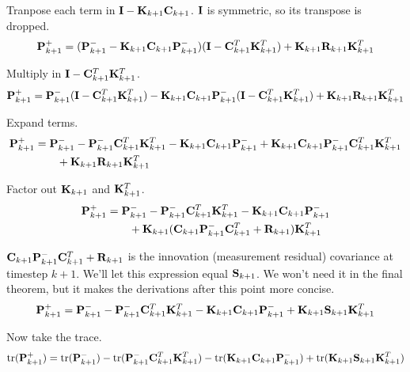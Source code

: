Tranpose each term in $\mathbf{I} - \mathbf{K}_{k+1}\mathbf{C}_{k+1}$. $\mathbf{I}$ is
symmetric, so its transpose is dropped.
\begin{equation*}
  \mathbf{P}_{k+1}^+ =
    (\mathbf{P}_{k+1}^- - \mathbf{K}_{k+1}\mathbf{C}_{k+1}\mathbf{P}_{k+1}^-)
    (\mathbf{I} - \mathbf{C}_{k+1}^T\mathbf{K}_{k+1}^T) +
    \mathbf{K}_{k+1}\mathbf{R}_{k+1} \mathbf{K}_{k+1}^T
\end{equation*}

Multiply in $\mathbf{I} - \mathbf{C}_{k+1}^T\mathbf{K}_{k+1}^T$.
\begin{equation*}
  \mathbf{P}_{k+1}^+ =
    \mathbf{P}_{k+1}^-(\mathbf{I} - \mathbf{C}_{k+1}^T\mathbf{K}_{k+1}^T) -
    \mathbf{K}_{k+1}\mathbf{C}_{k+1}\mathbf{P}_{k+1}^-
    (\mathbf{I} - \mathbf{C}_{k+1}^T\mathbf{K}_{k+1}^T) +
    \mathbf{K}_{k+1}\mathbf{R}_{k+1} \mathbf{K}_{k+1}^T
\end{equation*}

Expand terms.
\begin{align*}
  \mathbf{P}_{k+1}^+ &=
    \mathbf{P}_{k+1}^- - \mathbf{P}_{k+1}^-\mathbf{C}_{k+1}^T\mathbf{K}_{k+1}^T -
    \mathbf{K}_{k+1}\mathbf{C}_{k+1}\mathbf{P}_{k+1}^- +
    \mathbf{K}_{k+1}\mathbf{C}_{k+1}\mathbf{P}_{k+1}^-\mathbf{C}_{k+1}^T\mathbf{K}_{k+1}^T \\
    &\qquad + \mathbf{K}_{k+1}\mathbf{R}_{k+1} \mathbf{K}_{k+1}^T
\end{align*}

Factor out $\mathbf{K}_{k+1}$ and $\mathbf{K}_{k+1}^T$.
\begin{align*}
  \mathbf{P}_{k+1}^+ &=
    \mathbf{P}_{k+1}^- - \mathbf{P}_{k+1}^-\mathbf{C}_{k+1}^T\mathbf{K}_{k+1}^T -
    \mathbf{K}_{k+1}\mathbf{C}_{k+1}\mathbf{P}_{k+1}^- \nonumber \\
    &\qquad + \mathbf{K}_{k+1}(\mathbf{C}_{k+1}\mathbf{P}_{k+1}^-\mathbf{C}_{k+1}^T +
    \mathbf{R}_{k+1})\mathbf{K}_{k+1}^T
\end{align*}

$\mathbf{C}_{k+1}\mathbf{P}_{k+1}^-\mathbf{C}_{k+1}^T + \mathbf{R}_{k+1}$ is the innovation
(measurement residual) covariance at timestep $k + 1$. We'll let this expression
equal $\mathbf{S}_{k+1}$. We won't need it in the final theorem, but it makes the
derivations after this point more concise.
\begin{equation}
  \mathbf{P}_{k+1}^+ =
    \mathbf{P}_{k+1}^- - \mathbf{P}_{k+1}^-\mathbf{C}_{k+1}^T\mathbf{K}_{k+1}^T -
    \mathbf{K}_{k+1}\mathbf{C}_{k+1}\mathbf{P}_{k+1}^- +
    \mathbf{K}_{k+1}\mathbf{S}_{k+1}\mathbf{K}_{k+1}^T \label{eq:post_p_update}
\end{equation}

Now take the trace.
\begin{equation*}
  \operatorname{tr}(\mathbf{P}_{k+1}^+) =
    \operatorname{tr}(\mathbf{P}_{k+1}^-) - \operatorname{tr}(\mathbf{P}_{k+1}^-\mathbf{C}_{k+1}^T\mathbf{K}_{k+1}^T) -
    \operatorname{tr}(\mathbf{K}_{k+1}\mathbf{C}_{k+1}\mathbf{P}_{k+1}^-) +
    \operatorname{tr}(\mathbf{K}_{k+1}\mathbf{S}_{k+1}\mathbf{K}_{k+1}^T)
\end{equation*}


